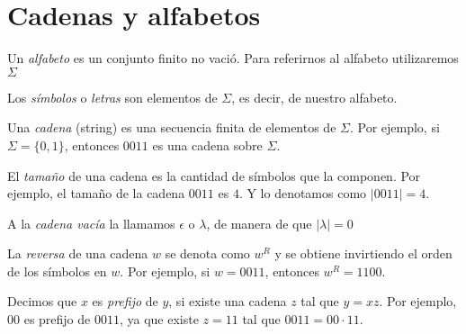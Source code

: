 \section{Cadenas y alfabetos}

\begin{Def}
Un \textit{alfabeto} es un conjunto finito no vació. Para referirnos al alfabeto utilizaremos $\Sigma$ 
\end{Def}

\begin{Def}
Los \textit{símbolos} o \textit{letras} son elementos de $\Sigma$, es decir, de nuestro alfabeto. 
\end{Def}

\begin{Def}
    Una \textit{cadena} (string) es una secuencia finita de elementos de $\Sigma$. Por ejemplo, si $\Sigma = \{0,1\}$, entonces $0011$ es una cadena sobre $\Sigma$.
\end{Def}

\begin{Def}
El \textit{tamaño} de una cadena es la cantidad de símbolos que la componen. Por ejemplo, el tamaño de la cadena $0011$ es $4$. Y lo denotamos como $|0011| = 4$.
\end{Def}

\begin{Def}
A la \textit{cadena vacía} la llamamos $\epsilon$  o $\lambda$, de manera de que $|\lambda| = 0$
\end{Def}

\begin{Def}
La \textit{reversa} de una cadena $w$ se denota como $w^R$ y se obtiene invirtiendo el orden de los símbolos en $w$. Por ejemplo, si $w = 0011$, entonces $w^R = 1100$.
\end{Def}

\begin{Def}
Decimos que $x$ es \textit{prefijo} de $y$,  si existe una cadena $z$ tal que $y = xz$. Por ejemplo, $00$ es prefijo de $0011$, ya que existe $z = 11$ tal que $0011 = 00 \cdot 11$.
\end{Def}
